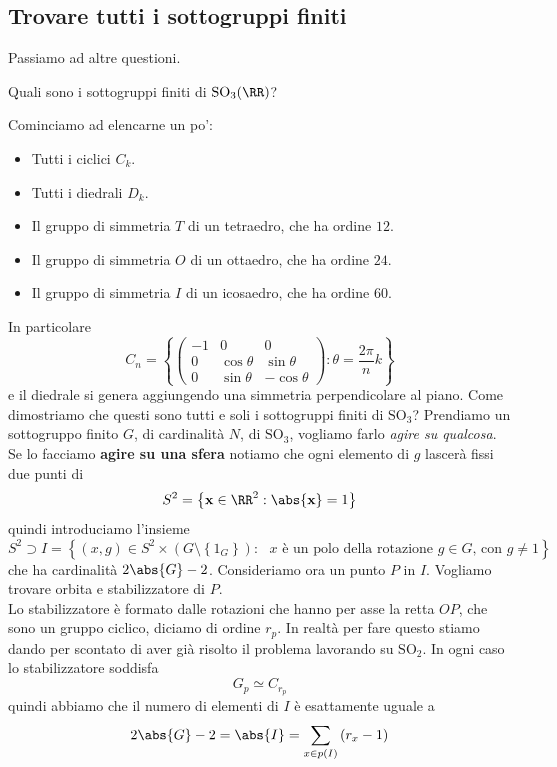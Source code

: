 \documentclass[11pt]{scrartcl}
\begin{document}
	\subsection{Trovare tutti i sottogruppi finiti}
	
	Passiamo ad altre questioni. 
	\begin{problem}
		Quali sono i sottogruppi finiti di $\text{SO}_3(\RR)$?
	\end{problem}
	Cominciamo ad elencarne un po':
	\begin{itemize}
		\item Tutti i ciclici $C_k$.
		\item Tutti i diedrali $D_k$.
		\item Il gruppo di simmetria $T$ di un tetraedro, che ha ordine $12$.
		\item Il gruppo di simmetria $O$ di un ottaedro, che ha ordine $24$.
		\item Il gruppo di simmetria $I$ di un icosaedro, che ha ordine $60$.
	\end{itemize}
	In particolare
	$$C_n=\left\{\begin{pmatrix}
		-1 & 0 & 0 \\
		0 & \cos\theta & \sin \theta \\
		0 & \sin\theta & -\cos\theta
	\end{pmatrix}:\theta=\frac{2\pi}{n}k\right\}
	$$
	e il diedrale si genera aggiungendo una simmetria perpendicolare al piano. Come dimostriamo che questi sono tutti e soli i sottogruppi finiti di $\text{SO}_3$? Prendiamo un sottogruppo finito $G$, di cardinalità $N$, di $\text{SO}_3$, vogliamo farlo \textit{agire su qualcosa}. Se lo facciamo \textbf{agire su una sfera} notiamo che ogni elemento di $g$ lascerà fissi due punti di 
	$$S^2=\left\{\mathbf{x}\in\RR^2:\abs{\mathbf{x}}=1\right\}$$
	quindi introduciamo l'insieme 
	$$S^2 \supset I =\left\{(x,g)\in S^2\times\left(G\setminus \left\{1_G\right\}\right):\text{ $x$ è un polo della rotazione $g\in G$, con $g\ne 1$}\right\}$$
	che ha cardinalità $2\abs{G}-2$. Consideriamo ora un punto $P$ in $I$. Vogliamo trovare orbita e stabilizzatore di $P$.\\
	Lo stabilizzatore è formato dalle rotazioni che hanno per asse la retta $OP$, che sono un gruppo ciclico, diciamo di ordine $r_p$. In realtà per fare questo stiamo dando per scontato di aver già risolto il problema lavorando su $\text{SO}_2$. In ogni caso lo stabilizzatore soddisfa
	$$G_p\simeq C_{r_p}$$
	quindi abbiamo che il numero di elementi di $I$ è esattamente uguale a
	$$2\abs{G}-2=\abs{I}=\sum_{x\in p(I)}\left(r_x-1\right)$$
\end{document}
